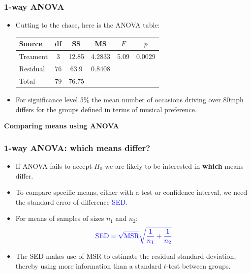 \documentclass[12pt,xcolor=dvipsnames,handout,mathserif,aspectratio=169]{beamer}
\newcommand{\bbl}[1]{{\color{NavyBlue} \textbf{#1}}}
\newcommand{\bgr}[1]{{\color{PineGreen} \textbf{#1}}}
\newcommand{\tc}{\textcolor}
\begin{document}
\begin{frame}\frametitle{1-way ANOVA}
\begin{itemize}
\item Cutting to the chase, here is the ANOVA table:\\
\begin{center}
{{
\begin{tabular}{lccccc}\hline
Source& df& SS& MS& $F$& $p$\\\hline
Treament & 3& 12.85& 4.2833& 5.09& 0.0029\\
Residual & 76& 63.9&0.8408&&\\ \hline
Total& 79& 76.75&&&\\ \hline
\end{tabular}}}
\end{center}

\item For significance level 5\% the mean number of occasions driving over 80mph differs for the groups defined in terms of musical preference.
\end{itemize}
\end{frame}

\begin{frame}
\huge{\bbl{Comparing means using ANOVA}}
\end{frame}

\begin{frame}
\frametitle{1-way ANOVA: which means differ?}
\begin{itemize}
\item If ANOVA fails to accept $H_0$ we are likely to be interested in \bgr{which} means differ.
\vspace{0.2cm}
\item To compare specific means, either with a test or confidence interval, we need the
standard error of difference \tc{blue}{SED}.
\vspace*{0.3cm}
\item For means of samples of sizes $n_1$ and $n_2$:
$$\tc{blue}{\mbox{SED} = \sqrt{\mbox{MSR}} \sqrt{\frac{1}{n_1}+\frac{1}{n_2}}}$$
\item The SED makes use of MSR to estimate the residual standard deviation, thereby using more information than a standard $t$-test between groups.
\end{itemize}
\end{frame}
\end{document}
